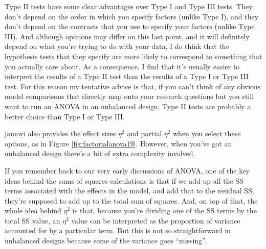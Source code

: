 Type II tests have some clear advantages over Type I and Type III tests. They don't depend on the order in which you specify factors (unlike Type I), and they don't depend on the contrasts that you use to specify your factors (unlike Type III). And although opinions may differ on this last point, and it will definitely depend on what you're trying to do with your data, I do think that the hypothesis tests that they specify are more likely to correspond to something that you actually care about. As a consequence, I find that it's usually easier to interpret the results of a Type II test than the results of a Type I or Type III test. For this reason my tentative advice is that, if you can't think of any obvious model comparisons that directly map onto your research questions but you still want to run an ANOVA in an unbalanced design, Type II tests are probably a better choice than Type I or Type III.


jamovi also provides the effect sizes $\eta^2$ and partial $\eta^2$ when you select these options, as in Figure \ref{fig:factorialanova19}. However, when you've got an unbalanced design there's a bit of extra complexity involved. 

If you remember back to our very early discussions of ANOVA, one of the key ideas behind the sums of squares calculations is that if we add up all the SS terms associated with the effects in the model, and add that to the residual SS, they're supposed to add up to the total sum of squares. And, on top of that, the whole idea behind $\eta^2$ is that, because you're dividing one of the SS terms by the total SS value, an $\eta^2$ value can be interpreted as the proportion of variance accounted for by a particular term. But this is not so straightforward in unbalanced designs because some of the variance goes ``missing''.

